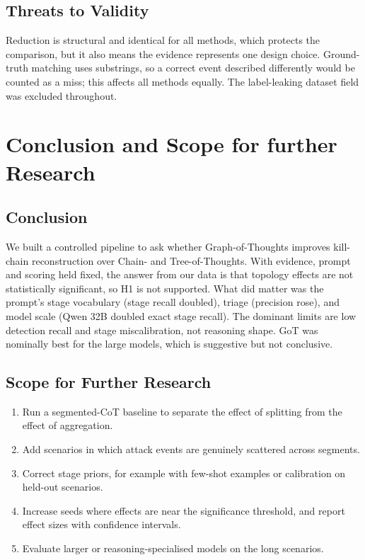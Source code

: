 \documentclass[a4paper, 12pt]{report}
\theoremstyle{definition}
\begin{document}
\section{Threats to Validity}
Reduction is structural and identical for all methods, which protects the comparison, but it also means the evidence represents one design choice. Ground-truth matching uses substrings, so a correct event described differently would be counted as a miss; this affects all methods equally. The label-leaking dataset field was excluded throughout.

\chapter{Conclusion and Scope for further Research}
\label{chap.8}
\section{Conclusion}
We built a controlled pipeline to ask whether Graph-of-Thoughts improves kill-chain reconstruction over Chain- and Tree-of-Thoughts. With evidence, prompt and scoring held fixed, the answer from our data is that topology effects are not statistically significant, so H1 is not supported. What did matter was the prompt's stage vocabulary (stage recall doubled), triage (precision rose), and model scale (Qwen 32B doubled exact stage recall). The dominant limits are low detection recall and stage miscalibration, not reasoning shape. GoT was nominally best for the large models, which is suggestive but not conclusive.

\section{Scope for Further Research}
\begin{enumerate}
	\item Run a segmented-CoT baseline to separate the effect of splitting from the effect of aggregation.
	\item Add scenarios in which attack events are genuinely scattered across segments.
	\item Correct stage priors, for example with few-shot examples or calibration on held-out scenarios.
	\item Increase seeds where effects are near the significance threshold, and report effect sizes with confidence intervals.
	\item Evaluate larger or reasoning-specialised models on the long scenarios.
\end{enumerate}
\end{document}
